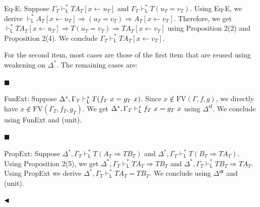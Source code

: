 Eq-E: Suppose $\Gamma_{T}\vdash_{\mathsf{L}}^{*}TA_{T}[x\leftarrow u_{T}]$ and $\Gamma_{T}\vdash_{\mathsf{L}}^{*}T(u_{T}=v_{T})$. Using Eq-E, we derive $\vdash_{\mathsf{L}}^{*}A_{T}[x\leftarrow u_{T}]\mathbin{\Rightarrow}(u_{T}=v_{T})\mathbin{\Rightarrow}A_{T}[x\leftarrow v_{T}]$. Therefore, we get $\vdash_{\mathsf{L}}^{*}TA_{T}[x\leftarrow u_{T}]\mathbin{\Rightarrow}T(u_{T}=v_{T})\mathbin{\Rightarrow}TA_{T}[x\leftarrow v_{T}]$ using Proposition 2(2) and Proposition 2(4). We conclude $\Gamma_{T}\vdash_{\mathsf{L}}^{*}TA_{T}[x\leftarrow v_{T}]$.\par
 
 
  
For the second item, most cases are those of the first item that are reused using weakening on $\Delta^{*}$. The remaining cases are:\par
  
\par\noindent  $\blacksquare$ 
 
FunExt: Suppose $\Delta^{*},\Gamma_{T}\vdash_{\mathsf{L}}^{*}T(f_{T}\leavevmode\nobreak\ x=g_{T}\leavevmode\nobreak\ x)$. Since $x\notin\text{{FV}}(\Gamma,f,g)$, we directly have $x\notin\text{{FV}}(\Gamma_{T},f_{T},g_{T})$. We get $\Delta^{*},\Gamma_{T}\vdash_{\mathsf{L}}^{*}f_{T}\leavevmode\nobreak\ x=g_{T}\leavevmode\nobreak\ x$ using $\Delta^{\mathfrak{e}\mathfrak{f}}$. We conclude using FunExt and (unit).\par
 
 
 
\par\noindent  $\blacksquare$ 
 
PropExt: Suppose $\Delta^{*},\Gamma_{T}\vdash_{\mathsf{L}}^{*}T(A_{T}\mathbin{\Rightarrow}TB_{T})$ and $\Delta^{*},\Gamma_{T}\vdash_{\mathsf{L}}^{*}T(B_{T}\mathbin{\Rightarrow}TA_{T})$. Using Proposition 2(5), we get $\Delta^{*},\Gamma_{T}\vdash_{\mathsf{L}}^{*}TA_{T}\mathbin{\Rightarrow}TB_{T}$ and $\Delta^{*},\Gamma_{T}\vdash_{\mathsf{L}}^{*}TB_{T}\mathbin{\Rightarrow}TA_{T}$. Using PropExt we derive $\Delta^{*},\Gamma_{T}\vdash_{\mathsf{L}}^{*}TA_{T}=TB_{T}$. We conclude using $\Delta^{\mathfrak{e}\mathfrak{p}}$ and (unit).\par
 
 
  
$\hfill\blacktriangleleft$\par
 
 

